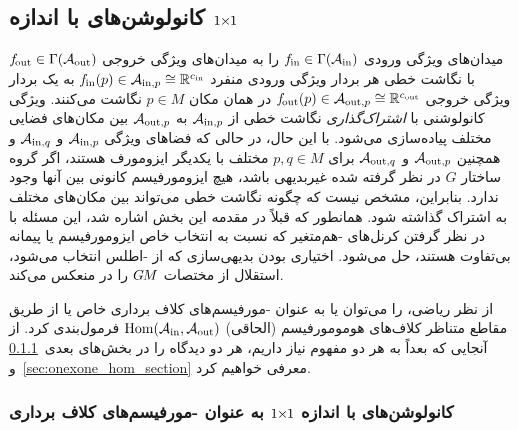 

\subsection[\texorpdfstring{کانولوشن‌های \lr{GM} با اندازه ${1\kern-2.7pt\times\kern-2.9pt1}$}{1x1} ]%
         {کانولوشن‌های  با اندازه \texorpdfstring{${1\kern-2.7pt\times\kern-2.9pt1}$}{1x1}}
\label{sec:onexone}


\onexoneGMs میدان‌های ویژگی ورودی $f_\textup{\;\!\!in}\in\Gamma(\mathcal{A}_\textup{in})$ را به میدان‌های ویژگی خروجی $f_\textup{\:\!\!out}\in\Gamma(\mathcal{A}_\textup{out})$ با نگاشت خطی هر بردار ویژگی ورودی منفرد $f_\textup{\;\!\!in}(p)\in\mathcal{A}_{\textup{in},p}\cong\mathbb{R}^{{c_\textup{in}}}$ به یک بردار ویژگی خروجی $f_\textup{\:\!\!out}(p)\in\mathcal{A}_{\textup{out},p}\cong\mathbb{R}^{{c_\textup{out}}}$ در همان مکان $p\in M$ نگاشت می‌کنند.
ویژگی کانولوشنی با \emph{اشتراک‌گذاری} نگاشت خطی از $\mathcal{A}_{\textup{in},p}$ به $\mathcal{A}_{\textup{out},p}$ بین مکان‌های فضایی مختلف پیاده‌سازی می‌شود.
با این حال، در حالی که فضاهای ویژگی $\mathcal{A}_{\textup{in},p}$ و $\mathcal{A}_{\textup{in},q}$ و همچنین $\mathcal{A}_{\textup{out},p}$ و $\mathcal{A}_{\textup{out},q}$ برای $p,q\in M$ مختلف با یکدیگر ایزومورف هستند، اگر گروه ساختار $G$ در نظر گرفته شده غیربدیهی باشد، هیچ ایزومورفیسم کانونی بین آنها وجود ندارد.
بنابراین، مشخص نیست که چگونه نگاشت خطی می‌تواند بین مکان‌های مختلف به اشتراک گذاشته شود.
همانطور که قبلاً در مقدمه این بخش اشاره شد، این مسئله با در نظر گرفتن کرنل‌های -هم‌متغیر که نسبت به انتخاب خاص ایزومورفیسم یا پیمانه بی‌تفاوت هستند، حل می‌شود.
اختیاری بودن بدیهی‌سازی که از -اطلس انتخاب می‌شود، استقلال از مختصات $G\mkern-1.4muM$ را در \onexoneGMs منعکس می‌کند.


از نظر ریاضی، \onexoneGMs را می‌توان یا به عنوان -مورفیسم‌های کلاف برداری خاص یا از طریق مقاطع متناظر کلاف‌های هومومورفیسم (الحاقی) $\operatorname{Hom}(\mathcal{A}_\textup{in},\mathcal{A}_\textup{out})$ فرمول‌بندی کرد.
از آنجایی که بعداً به هر دو مفهوم نیاز داریم، هر دو دیدگاه را در بخش‌های بعدی~\ref{sec:onexone_M_morphism} و~\ref{sec:onexone_hom_section} معرفی خواهیم کرد.


\subsubsection[\texorpdfstring{کانولوشن‌های \lr{GM} با اندازه ${1\kern-2.7pt\times\kern-2.9pt1}$}{1x1} به عنوان \lr{M}-مورفیسم‌های کلاف برداری]%
          {کانولوشن‌های  با اندازه \texorpdfstring{${1\kern-2.7pt\times\kern-2.9pt1}$}{1x1} به عنوان -مورفیسم‌های کلاف برداری}
\label{sec:onexone_M_morphism}


